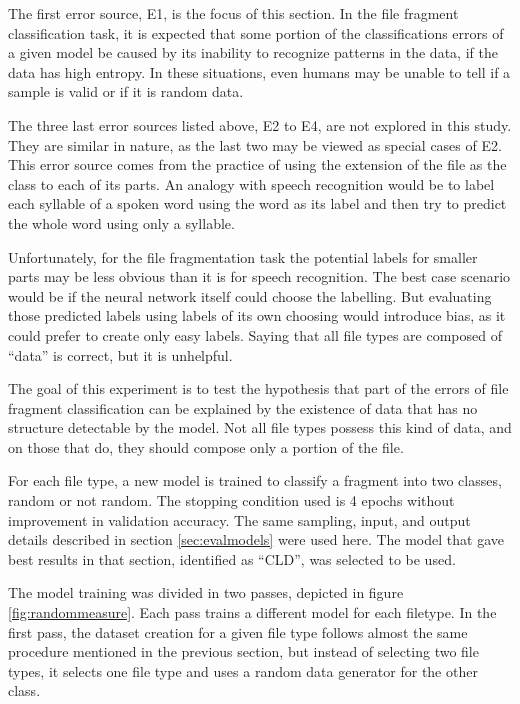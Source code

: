 The first error source, E1, is the focus of this section. In the file fragment classification task, it is expected that some portion of the classifications errors of a given model be caused by its inability to recognize patterns in the data, if the data has high entropy. In these situations, even humans may be unable to tell if a sample is valid or if it is random data.

The three last error sources listed above, E2 to E4, are not explored in this study. They are similar in nature, as the last two may be viewed as special cases of E2. This error source comes from the practice of using the extension of the file as the class to each of its parts. An analogy with speech recognition would be to label each syllable of a spoken word using the word as its label and then try to predict the whole word using only a syllable.

Unfortunately, for the file fragmentation task the potential labels for smaller parts may be less obvious than it is for speech recognition. The best case scenario would be if the neural network itself could choose the labelling. But evaluating those predicted labels using labels of its own choosing would introduce bias, as it could prefer to create only easy labels. Saying that all file types are composed of ``data'' is correct, but it is unhelpful.

The goal of this experiment is to test the hypothesis that part of the errors of file fragment classification  can be explained by the existence of data that has no structure detectable by the model. Not all file types possess this kind of data, and on those that do, they should compose only a portion of the file.


For each file type, a new model is trained to classify a fragment into two classes, random or not random. The stopping condition used is 4 epochs without improvement in validation accuracy.
The same sampling, input, and output details described in section \ref{sec:evalmodels} were used here. The model that gave best results in that section, identified as ``CLD'', was selected to be used.


The model training was divided in two passes, depicted in figure \ref{fig:randommeasure}. Each pass trains a different model for each filetype. In the first pass, the dataset creation for a given file type follows almost the same procedure mentioned in the previous section, but instead of selecting two file types, it selects one file type and uses a random data generator for the other class.

